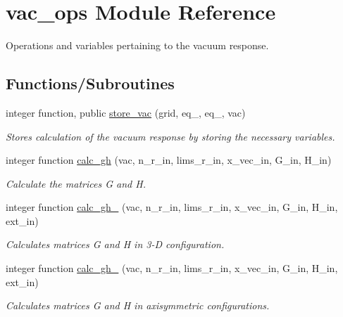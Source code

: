 \hypertarget{namespacevac__ops}{}\section{vac\+\_\+ops Module Reference}
\label{namespacevac__ops}


Operations and variables pertaining to the vacuum response.  


\subsection*{Functions/\+Subroutines}
\begin{DoxyCompactItemize}
\item 
integer function, public \hyperlink{namespacevac__ops_a37220702fbf378626a0f2c12f446e0aa}{store\+\_\+vac} (grid, eq\+\_, eq\+\_, vac)
\begin{DoxyCompactList}\small\item\em Stores calculation of the vacuum response by storing the necessary variables. \end{DoxyCompactList}\item 
integer function \hyperlink{namespacevac__ops_a7e3f92fbe9fa6cf3de6ac301676b96d1}{calc\+\_\+gh} (vac, n\+\_\+r\+\_\+in, lims\+\_\+r\+\_\+in, x\+\_\+vec\+\_\+in, G\+\_\+in, H\+\_\+in)
\begin{DoxyCompactList}\small\item\em Calculate the matrices {\ttfamily G} and {\ttfamily H}. \end{DoxyCompactList}\item 
integer function \hyperlink{namespacevac__ops_a267742c3c9a1b395aee76527d1e8352c}{calc\+\_\+gh\+\_} (vac, n\+\_\+r\+\_\+in, lims\+\_\+r\+\_\+in, x\+\_\+vec\+\_\+in, G\+\_\+in, H\+\_\+in, ext\+\_\+in)
\begin{DoxyCompactList}\small\item\em Calculates matrices {\ttfamily G} and {\ttfamily H} in 3-\/D configuration. \end{DoxyCompactList}\item 
integer function \hyperlink{namespacevac__ops_ae4987d1f48f1f83b1f0d38ea85b4998b}{calc\+\_\+gh\+\_} (vac, n\+\_\+r\+\_\+in, lims\+\_\+r\+\_\+in, x\+\_\+vec\+\_\+in, G\+\_\+in, H\+\_\+in, ext\+\_\+in)
\begin{DoxyCompactList}\small\item\em Calculates matrices {\ttfamily G} and {\ttfamily H} in axisymmetric configurations. \end{DoxyCompactList}\item 

\end{DoxyCompactItemize}
